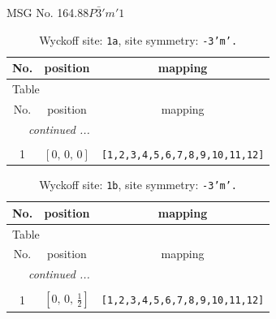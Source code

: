 \documentclass[fleqn,8pt]{jsarticle}
\begin{document}
\setcounter{MaxMatrixCols}{32}

\renewcommand{\tablename}{Table~}
\renewcommand{\figurename}{Figure~}
\begin{center}
\LARGE
MSG No. 164.88\quad$P\bar{3}'m'1$
\end{center}
\renewcommand{\arraystretch}{1.2}
\begin{longtable}{ccc}
\caption{Wyckoff site: {\tt 1a}, site symmetry: {\tt -3'm'.}}
 \\
 \hline \hline
No. & position & mapping \\ \hline \endfirsthead

\multicolumn{2}{l}{\tablename\ \thetable{}} \\
 \hline \hline
No. & position & mapping \\ \hline \endhead

 \hline \hline
\multicolumn{2}{r}{\footnotesize\it continued ...} \\ \endfoot

 \hline \hline
\multicolumn{2}{r}{} \\ \endlastfoot

1 & $\left[ 0,\, 0,\, 0 \right]$ & {\tt [1,2,3,4,5,6,7,8,9,10,11,12]} \\
\end{longtable}
\renewcommand{\arraystretch}{1.2}
\begin{longtable}{ccc}
\caption{Wyckoff site: {\tt 1b}, site symmetry: {\tt -3'm'.}}
 \\
 \hline \hline
No. & position & mapping \\ \hline \endfirsthead

\multicolumn{2}{l}{\tablename\ \thetable{}} \\
 \hline \hline
No. & position & mapping \\ \hline \endhead

 \hline \hline
\multicolumn{2}{r}{\footnotesize\it continued ...} \\ \endfoot

 \hline \hline
\multicolumn{2}{r}{} \\ \endlastfoot

1 & $\left[ 0,\, 0,\, \frac{1}{2} \right]$ & {\tt [1,2,3,4,5,6,7,8,9,10,11,12]} \\
\end{longtable}
\renewcommand{\arraystretch}{1.2}
\end{document}
